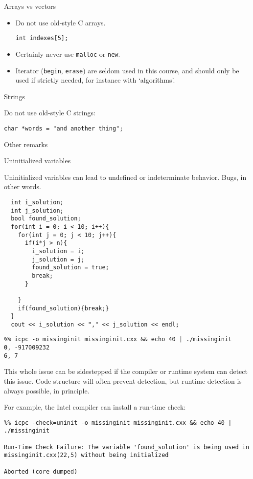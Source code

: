  {Arrays vs vectors}

\begin{itemize}
\item Do not use old-style C arrays.
\begin{lstlisting}
int indexes[5];    
\end{lstlisting}
\item Certainly never use \lstinline{malloc} or \lstinline{new}.
\item Iterator (\lstinline{begin}, \lstinline{erase}) are
  seldom used in this course, and should only be used if strictly needed,
  for instance with `algorithms'.
\end{itemize}

 {Strings}

Do not use old-style C strings:
\begin{lstlisting}
char *words = "and another thing";
\end{lstlisting}

 {Other remarks}

 {Uninitialized variables}

Uninitialized variables can lead to undefined or indeterminate behavior.
Bugs, in other words.

\lstset{language=C++}
\begin{lstlisting}
  int i_solution;
  int j_solution;
  bool found_solution;
  for(int i = 0; i < 10; i++){
    for(int j = 0; j < 10; j++){
      if(i*j > n){
        i_solution = i;
        j_solution = j;
        found_solution = true;
        break;
      }

    }
    if(found_solution){break;}
  }
  cout << i_solution << "," << j_solution << endl;
\end{lstlisting}

\begin{verbatim}
%% icpc -o missinginit missinginit.cxx && echo 40 | ./missinginit
0, -917009232
6, 7
\end{verbatim}

This whole issue can be sidestepped if the compiler or runtime system
can detect this issue.
Code structure will often prevent detection, 
but runtime detection is always possible, in principle.

For example, the Intel compiler can install a run-time check:

\begin{verbatim}
%% icpc -check=uninit -o missinginit missinginit.cxx && echo 40 | ./missinginit

Run-Time Check Failure: The variable 'found_solution' is being used in missinginit.cxx(22,5) without being initialized

Aborted (core dumped)
\end{verbatim}

